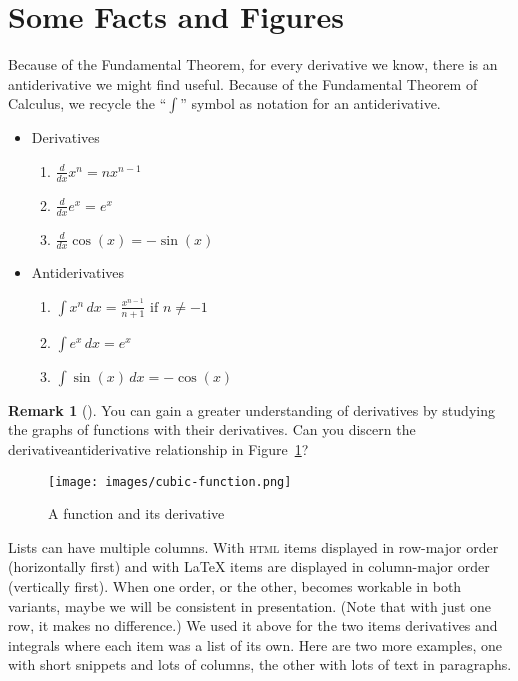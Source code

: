 \documentclass[10pt,]{article}
\newcommand{\initialism}[1]{\textsc{\MakeLowercase{#1}}}
\theoremstyle{plain}
\theoremstyle{definition}
\theoremstyle{definition}
\newtheorem{remark}[theorem]{Remark}
\theoremstyle{definition}
\theoremstyle{definition}
\theoremstyle{definition}
\theoremstyle{definition}
\numberwithin{equation}{section}
\newcommand{\indefiniteintegral}[2]{\int#1\,d#2}
\begin{document}
\section[{Some Facts and Figures}]{Some Facts and Figures}\label{section-5}
\hypertarget{p-143}{}%
Because of the Fundamental Theorem, for every derivative we know, there is an antiderivative we might find useful.  Because of the Fundamental Theorem of Calculus, we recycle the ``\(\int\)'' symbol as notation for an antiderivative.\leavevmode%
\begin{multicols}{2}
\begin{itemize}[label=\textbullet]
\item{}\hypertarget{p-144}{}%
Derivatives%
\begin{enumerate}[label=(\alph*)]
\item\hypertarget{li-8}{}\(\frac{d}{dx}x^n = nx^{n-1}\)%
\item\hypertarget{li-9}{}\(\frac{d}{dx}e^x = e^x\)%
\item\hypertarget{li-10}{}\(\frac{d}{dx}\cos(x) = -\sin(x)\)%
\end{enumerate}
%
\item{}\hypertarget{p-145}{}%
Antiderivatives%
\begin{enumerate}[label=\roman*)]
\item\hypertarget{li-12}{}\(\indefiniteintegral{x^n}{x} = \displaystyle\frac{x^{n-1}}{n+1}\text{ if }n\neq -1\)%
\item\hypertarget{li-13}{}\(\indefiniteintegral{e^x}{x} = e^x\)%
\item\hypertarget{li-14}{}\(\indefiniteintegral{\sin(x)}{x} = -\cos(x)\)%
\end{enumerate}
%
\end{itemize}
\end{multicols}
%
\begin{remark}[]\label{remark-1}
\hypertarget{p-146}{}%
You can gain a greater understanding of derivatives by studying the graphs of functions with their derivatives.  Can you discern the derivative\textendash{}antiderivative relationship in Figure~\hyperref[figure-function-derivative]{\ref{figure-function-derivative}}?%
\end{remark}
\begin{figure}
\centering
\texttt{[image: images/cubic-function.png]}
\caption{A function and its derivative\label{figure-function-derivative}}
\end{figure}
\hypertarget{p-147}{}%
Lists can have multiple columns.  With \initialism{HTML} items displayed in row-major order (horizontally first) and with \LaTeX{} items are displayed in column-major order (vertically first).  When one order, or the other, becomes workable in both variants, maybe we will be consistent in presentation.  (Note that with just one row, it makes no difference.)  We used it above for the two items \textemdash{} derivatives and integrals \textemdash{} where each item was a list of its own.  Here are two more examples, one with short snippets and lots of columns, the other with lots of text in paragraphs.\leavevmode%
\end{document}
